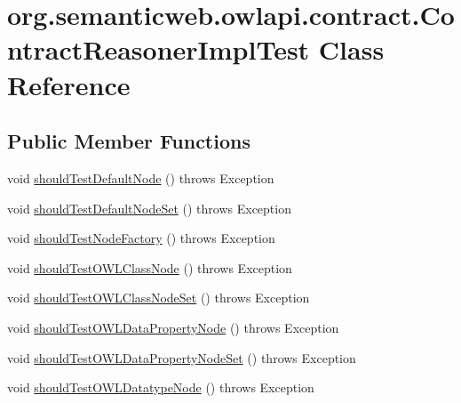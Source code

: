 \hypertarget{classorg_1_1semanticweb_1_1owlapi_1_1contract_1_1_contract_reasoner_impl_test}{\section{org.\-semanticweb.\-owlapi.\-contract.\-Contract\-Reasoner\-Impl\-Test Class Reference}
\label{classorg_1_1semanticweb_1_1owlapi_1_1contract_1_1_contract_reasoner_impl_test}
}
\subsection*{Public Member Functions}
\begin{DoxyCompactItemize}
\item 
void \hyperlink{classorg_1_1semanticweb_1_1owlapi_1_1contract_1_1_contract_reasoner_impl_test_a0c2dd926169aa6a6a260fe6991818135}{should\-Test\-Default\-Node} ()  throws Exception 
\item 
void \hyperlink{classorg_1_1semanticweb_1_1owlapi_1_1contract_1_1_contract_reasoner_impl_test_a5e335cffccbd5cc878b658954a46d79f}{should\-Test\-Default\-Node\-Set} ()  throws Exception 
\item 
void \hyperlink{classorg_1_1semanticweb_1_1owlapi_1_1contract_1_1_contract_reasoner_impl_test_a2f2e0bc8a0ef2f1209a6de82ff59e425}{should\-Test\-Node\-Factory} ()  throws Exception 
\item 
void \hyperlink{classorg_1_1semanticweb_1_1owlapi_1_1contract_1_1_contract_reasoner_impl_test_ae49b3f8aef10f46cbf5c07c78610818c}{should\-Test\-O\-W\-L\-Class\-Node} ()  throws Exception 
\item 
void \hyperlink{classorg_1_1semanticweb_1_1owlapi_1_1contract_1_1_contract_reasoner_impl_test_adc581990ce08a8a43d1e27abedf7e99f}{should\-Test\-O\-W\-L\-Class\-Node\-Set} ()  throws Exception 
\item 
void \hyperlink{classorg_1_1semanticweb_1_1owlapi_1_1contract_1_1_contract_reasoner_impl_test_a250b3aa36a627c9e86196e0753d51fb8}{should\-Test\-O\-W\-L\-Data\-Property\-Node} ()  throws Exception 
\item 
void \hyperlink{classorg_1_1semanticweb_1_1owlapi_1_1contract_1_1_contract_reasoner_impl_test_adff13428b8c9c0691c738f8e7a1b8a1c}{should\-Test\-O\-W\-L\-Data\-Property\-Node\-Set} ()  throws Exception 
\item 
void \hyperlink{classorg_1_1semanticweb_1_1owlapi_1_1contract_1_1_contract_reasoner_impl_test_ae7953014c9830598baf3ea3c60f375b4}{should\-Test\-O\-W\-L\-Datatype\-Node} ()  throws Exception 

\end{DoxyCompactItemize}
